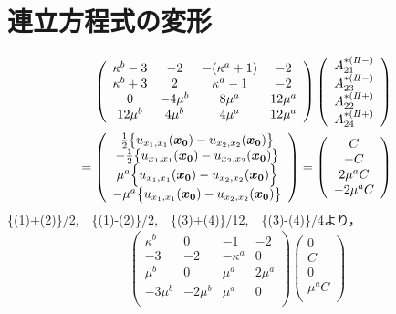 \documentclass[titlepage,a4paper,12pt,oneside,dvipdfmx]{jsbook}
\begin{document}
\chapter{連立方程式の変形}

\begin{align}
	\left(
	\begin{array}{cccc}
		\kappa^b-3& -2 & -(\kappa^a+1) & -2 \\
		\kappa^b+3 & 2 & \kappa^a-1 & -2 \\
		0 & -4\mu^{b} & 8\mu^{a} & 12\mu^{a} \\
		12\mu^{b} & 4\mu^{b} & 4\mu^{a} & 12\mu^{a} \\
	\end{array}
	\right)
	\left(
	\begin{array}{c}
		A_{21}^{*(I\hspace{-.15em}I-)} \\
	 	A_{23}^{*(I\hspace{-.15em}I-)} \\
		A_{22}^{*(I\hspace{-.15em}I+)}\\
	 	A_{24}^{*(I\hspace{-.15em}I+)} \\
	\end{array}
	\right)
	\nonumber
	\\
	=
	\left(
	\begin{array}{c}
		\frac{1}{2}\bigl\{u_{x_{1},x_{1}}(\bm{x_{0}})-u_{x_{2},x_{2}}(\bm{x_{0}})\bigr\} \\
	 	-\frac{1}{2}\bigl\{u_{x_{1},x_{1}}(\bm{x_{0}})-u_{x_{2},x_{2}}(\bm{x_{0}})\bigr\} \\
		\mu^a\Bigl\{ u_{x_{1},x_{1}}(\bm{x_{0}})- u_{x_{2},x_{2}}(\bm{x_{0}})\Bigr\} \\
	 	-\mu^a \bigl\{u_{x_{1},x_{1}}(\bm{x_{0}})-u_{x_{2},x_{2}}(\bm{x_{0}})\bigr\} \\
	\end{array}
	\right)
	=
	\left(
	\begin{array}{c}
		C \\
	 	-C \\
		2\mu^{a}C \\
	 	-2\mu^{a}C \\
	\end{array}
	\right)
\end{align}
\{(1)+(2)\}/2,　\{(1)-(2)\}/2,　\{(3)+(4)\}/12,　\{(3)-(4)\}/4より，
\begin{align}
	\left(
	\begin{array}{cccc}
		\kappa^b & 0 & -1 & -2 \\
		-3 & -2 & -\kappa^a & 0 \\
		\mu^{b} & 0 & \mu^{a} & 2\mu^{a} \\
		-3\mu^{b} & -2\mu^{b} & \mu^{a} & 0 \\
	\end{array}
	\right)
	\left(
	\begin{array}{c}
		0 \\
	 	C \\
		0 \\
	 	\mu^{a}C \\
	\end{array}
	\right)
\end{align}
\end{document}
